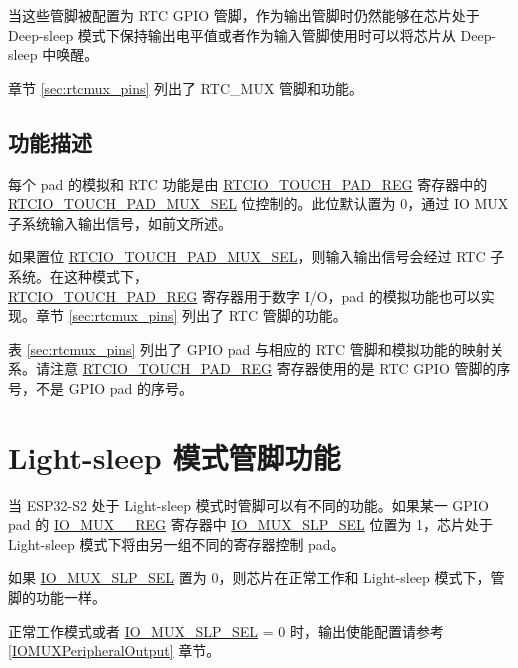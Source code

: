 \documentclass[main\_\_CN.tex]{subfiles}
\begin{document}
当这些管脚被配置为 RTC GPIO 管脚，作为输出管脚时仍然能够在芯片处于 Deep-sleep 模式下保持输出电平值或者作为输入管脚使用时可以将芯片从 Deep-sleep 中唤醒。

章节 \ref{sec:rtcmux_pins} 列出了 RTC\_MUX 管脚和功能。

\subsection{功能描述}

每个 pad 的模拟和 RTC 功能是由 \hyperref[regdesc:RTCIOTOUCHPADNREG]{RTCIO\_TOUCH\_PAD\_REG} 寄存器中的 \hyperref[fielddesc:RTCIOTOUCHPADNMUXSEL]{RTCIO\_TOUCH\_PAD\_MUX\_SEL} 位控制的。此位默认置为 0，通过 IO MUX 子系统输入输出信号，如前文所述。

如果置位 \hyperref[fielddesc:RTCIOTOUCHPADNMUXSEL]{RTCIO\_TOUCH\_PAD\_MUX\_SEL}，则输入输出信号会经过 RTC 子系统。在这种模式下，\\\hyperref[regdesc:RTCIOTOUCHPADNREG]{RTCIO\_TOUCH\_PAD\_REG} 寄存器用于数字 I/O，pad 的模拟功能也可以实现。章节 \ref{sec:rtcmux_pins} 列出了 RTC 管脚的功能。

表 \ref{sec:rtcmux_pins} 列出了 GPIO pad 与相应的 RTC 管脚和模拟功能的映射关系。请注意 \hyperref[regdesc:RTCIOTOUCHPADNREG]{RTCIO\_TOUCH\_PAD\_REG} 寄存器使用的是 RTC GPIO 管脚的序号，不是 GPIO pad 的序号。

\section{Light-sleep 模式管脚功能}

当 ESP32-S2 处于 Light-sleep 模式时管脚可以有不同的功能。如果某一 GPIO pad 的 \hyperref[regdesc:IOMUXnREG]{IO\_MUX\_\_REG} 寄存器中 \hyperref[fielddesc:IOMUXSLPSEL]{IO\_MUX\_SLP\_SEL} 位置为 1，芯片处于 Light-sleep 模式下将由另一组不同的寄存器控制 pad。



如果 \hyperref[fielddesc:IOMUXSLPSEL]{IO\_MUX\_SLP\_SEL} 置为 0，则芯片在正常工作和 Light-sleep 模式下，管脚的功能一样。

\begin{tiplisting}
正常工作模式或者 \hyperref[fielddesc:IOMUXSLPSEL]{IO\_MUX\_SLP\_SEL} = 0 时，输出使能配置请参考 \ref{IOMUXPeripheralOutput} 章节。

\end{tiplisting}
\end{document}
